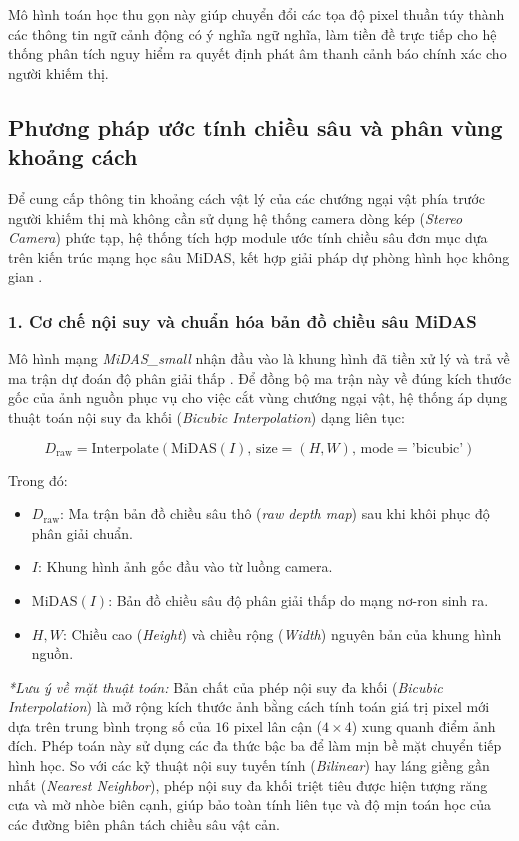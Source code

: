 Mô hình toán học thu gọn này giúp chuyển đổi các tọa độ pixel thuần túy thành các thông tin ngữ cảnh động có ý nghĩa ngữ nghĩa, làm tiền đề trực tiếp cho hệ thống phân tích nguy hiểm ra quyết định phát âm thanh cảnh báo chính xác cho người khiếm thị.
\subsection{Phương pháp ước tính chiều sâu và phân vùng khoảng cách}

Để cung cấp thông tin khoảng cách vật lý của các chướng ngại vật phía trước người khiếm thị mà không cần sử dụng hệ thống camera dòng kép (\textit{Stereo Camera}) phức tạp, hệ thống tích hợp module ước tính chiều sâu đơn mục dựa trên kiến trúc mạng học sâu MiDAS, kết hợp giải pháp dự phòng hình học không gian \cite{Reference11}.

\subsubsection*{1. Cơ chế nội suy và chuẩn hóa bản đồ chiều sâu MiDAS}

Mô hình mạng \textit{MiDAS\_small} nhận đầu vào là khung hình đã tiền xử lý và trả về ma trận dự đoán độ phân giải thấp \cite{Reference11}. Để đồng bộ ma trận này về đúng kích thước gốc của ảnh nguồn phục vụ cho việc cắt vùng chướng ngại vật, hệ thống áp dụng thuật toán nội suy đa khối (\textit{Bicubic Interpolation}) dạng liên tục:

\begin{equation}
    D_{\text{raw}} = \text{Interpolate}\left(\text{MiDAS}(I), \, \text{size}=(H, W), \, \text{mode}=\text{'bicubic'}\right)
\end{equation}

Trong đó:
\begin{itemize}
    \item $D_{\text{raw}}$: Ma trận bản đồ chiều sâu thô (\textit{raw depth map}) sau khi khôi phục độ phân giải chuẩn.
    \item $I$: Khung hình ảnh gốc đầu vào từ luồng camera.
    \item $\text{MiDAS}(I)$: Bản đồ chiều sâu độ phân giải thấp do mạng nơ-ron sinh ra.
    \item $H, W$: Chiều cao (\textit{Height}) và chiều rộng (\textit{Width}) nguyên bản của khung hình nguồn.
\end{itemize}

\textit{*Lưu ý về mặt thuật toán:} Bản chất của phép nội suy đa khối (\textit{Bicubic Interpolation}) là mở rộng kích thước ảnh bằng cách tính toán giá trị pixel mới dựa trên trung bình trọng số của $16$ pixel lân cận ($4 \times 4$) xung quanh điểm ảnh đích. Phép toán này sử dụng các đa thức bậc ba để làm mịn bề mặt chuyển tiếp hình học. So với các kỹ thuật nội suy tuyến tính (\textit{Bilinear}) hay láng giềng gần nhất (\textit{Nearest Neighbor}), phép nội suy đa khối triệt tiêu được hiện tượng răng cưa và mờ nhòe biên cạnh, giúp bảo toàn tính liên tục và độ mịn toán học của các đường biên phân tách chiều sâu vật cản.

